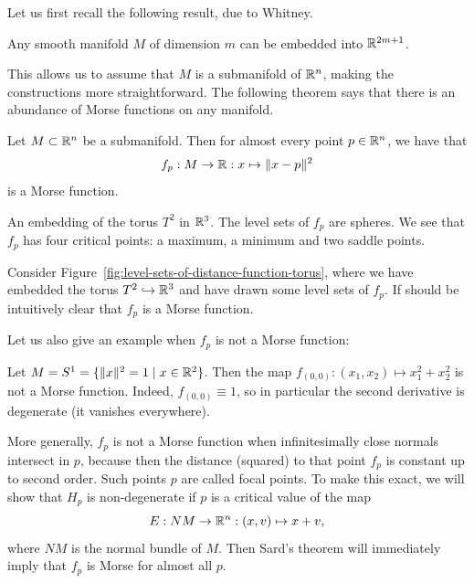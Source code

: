 Let us first recall the following result, due to Whitney.
\begin{theorem}
    Any smooth manifold $M$ of dimension $m$ can be embedded into  $\mathbb{R}^{2m+1}$.
\end{theorem}
This allows us to assume that $M$ is a submanifold of $\mathbb{R}^{n}$, making the constructions  more straightforward.
The following theorem says that there is an abundance of Morse functions on any manifold.
\begin{prop}
    Let $M \subset \mathbb{R}^{n}$ be a submanifold.
    Then for almost every point $p \in \mathbb{R}^{n}$, we have that
    \[
    f_p : M \to \mathbb{R}: x \mapsto  \|x - p\|^2
    \] 
    is a Morse function.
\end{prop}
\begin{marginfigure}[-4cm]
    \centering
    \caption{An embedding of the torus $T^2$ in $\mathbb{R}^3$. The level sets of $f_p$ are spheres. We see that $f_p$ has four critical points: a maximum, a minimum and two saddle points.}
    \label{fig:level-sets-of-distance-function-torus}
\end{marginfigure}
\begin{eg}
    Consider Figure~\ref{fig:level-sets-of-distance-function-torus}, where we have embedded the torus $T^{2} \hookrightarrow \mathbb{R}^3$ and have drawn some level sets of $f_p$.
    If should be intuitively clear that  $f_p$ is a Morse function.
\end{eg}
Let us also give an example when $f_p$ is not a Morse function:
\begin{noneg}
    Let $M = S^1 = \{\|x\|^2 = 1  \mid  x \in \mathbb{R}^2\} $.
    Then the map $f_{(0, 0)}:(x_1,x_2)\mapsto x_1^2 + x_2^2$ is not a Morse function.
    Indeed, $f_{(0, 0)} \equiv 1$, so in particular the second derivative is degenerate (it vanishes everywhere).
\end{noneg}


More generally, $f_p$ is not a Morse function when infinitesimally close normals intersect in $p$, because then the distance (squared) to that point $f_p$ is constant up to second order.
Such points $p$ are called focal points.
To make this exact, we will show that $H_p$ is non-degenerate if $p$ is a critical value of the map
\[
    E: NM \to  \mathbb{R}^{n}: (x, v) \mapsto x + v
,\]
where $NM$ is the normal bundle of $M$.
Then Sard's theorem will immediately imply that $f_p$ is Morse for almost all $p$.

\begin{figure}[H]
    \centering
    \label{fig:existence-of-morse-functions-normal-bundle-map}
\end{figure}

